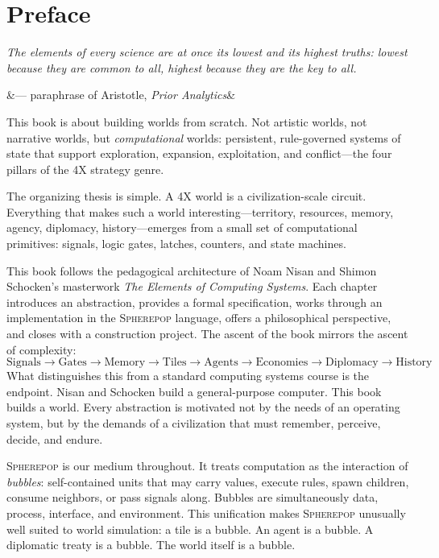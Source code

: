 \documentclass[11pt,a4paper,openany]{book}
\theoremstyle{plain}
\theoremstyle{definition}
\theoremstyle{remark}
\newcommand{\Sp}{\textsc{Spherepop}\xspace}
\newcommand{\chapterquote}[2]{%
  \par\vspace{0.8em}%
  \begin{flushright}%
    \begin{minipage}{0.65\textwidth}%
      {\itshape #1\par}%
      \ifx&#2&\else\vspace{0.3em}{\raggedleft\small--- #2\par}\fi%
    \end{minipage}%
  \end{flushright}%
  \vspace{0.8em}\par\noindent}
\begin{document}
\chapter*{Preface}

\chapterquote{The elements of every science are at once its lowest and its
  highest truths: lowest because they are common to all, highest because
  they are the key to all.
}{--- paraphrase of Aristotle, \textit{Prior Analytics}}

This book is about building worlds from scratch. Not artistic worlds, not
narrative worlds, but \emph{computational} worlds: persistent, rule-governed
systems of state that support exploration, expansion, exploitation, and
conflict---the four pillars of the 4X strategy genre.

The organizing thesis is simple. A 4X world is a civilization-scale circuit.
Everything that makes such a world interesting---territory, resources, memory,
agency, diplomacy, history---emerges from a small set of computational
primitives: signals, logic gates, latches, counters, and state machines.

This book follows the pedagogical architecture of Noam Nisan and Shimon
Schocken's masterwork \textit{The Elements of Computing Systems}. Each
chapter introduces an abstraction, provides a formal specification, works
through an implementation in the \Sp{} language, offers a philosophical
perspective, and closes with a construction project. The ascent of the
book mirrors the ascent of complexity:
\[
  \text{Signals} \to \text{Gates} \to \text{Memory}
  \to \text{Tiles} \to \text{Agents}
  \to \text{Economies} \to \text{Diplomacy}
  \to \text{History}
\]
What distinguishes this from a standard computing systems course is the
endpoint. Nisan and Schocken build a general-purpose computer. This book
builds a world. Every abstraction is motivated not by the needs of an
operating system, but by the demands of a civilization that must remember,
perceive, decide, and endure.

\Sp{} is our medium throughout. It treats computation as the interaction of
\emph{bubbles}: self-contained units that may carry values, execute rules,
spawn children, consume neighbors, or pass signals along. Bubbles are
simultaneously data, process, interface, and environment. This unification
makes \Sp{} unusually well suited to world simulation: a tile is a bubble.
An agent is a bubble. A diplomatic treaty is a bubble. The world itself is
a bubble.
\end{document}
